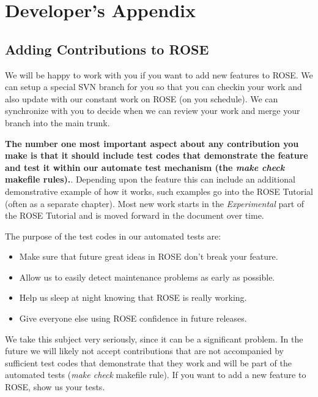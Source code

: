 
\chapter{ Developer's Appendix }
\label{developersAppendix:developersAppendix}

\section{Adding Contributions to ROSE}%

   We will be happy to work with you if you want to add new features to ROSE.
We can setup a special SVN branch for you so that you can checkin your work and
also update with our constant work on ROSE (on you schedule).  We can synchronize with 
you to decide when we can review your work and merge your branch into the main trunk.

{\bf The number one most important aspect about any contribution you make is that it
should include test codes that demonstrate the feature and test it within our 
automate test mechanism (the {\em make check} makefile rules).}. Depending upon the 
feature this can include an additional demonstrative example of how it works, such
examples go into the ROSE Tutorial (often as a separate chapter).  Most new work
starts in the {\em Experimental} part of the ROSE Tutorial and is moved forward
in the document over time.

The purpose of the test codes in our automated tests are:
\begin{itemize}
   \item Make sure that future great ideas in ROSE don't break your feature.
   \item Allow us to easily detect maintenance problems as early as possible.
   \item Help us sleep at night knowing that ROSE is really working.
   \item Give everyone else using ROSE confidence in future releases.
\end{itemize}

We take this subject very seriously, since it can be a significant problem.
In the future we will likely not accept contributions that are not accompanied 
by sufficient test codes that demonstrate that they work and will be part of the
automated tests ({\em make check} makefile rule).  If you want to add a new 
feature to ROSE, show us your tests.

%

